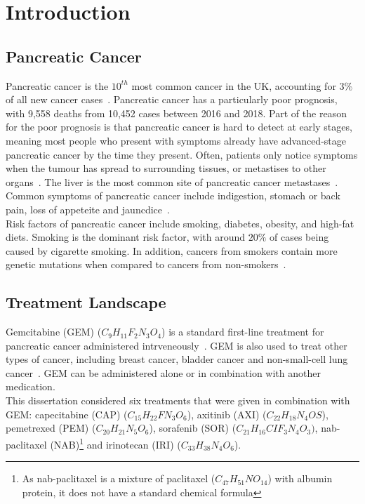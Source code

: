 \chapter{Introduction}

\section{Pancreatic Cancer}
Pancreatic cancer is the $10^{th}$ most common cancer in the UK, accounting for $3\%$ of all new cancer cases~\cite{pancStat}. Pancreatic cancer has a particularly poor prognosis, with 9,558 deaths from 10,452 cases between 2016 and 2018. Part of the reason for the poor prognosis is that pancreatic cancer is hard to detect at early stages, meaning most people who present with symptoms already have advanced-stage pancreatic cancer by the time they present. Often, patients only notice symptoms when the tumour has spread to surrounding tissues, or metastises to other organs~\cite{kelsen}. The liver is the most common site of pancreatic cancer metastases~\cite{deeb}. Common symptoms of pancreatic cancer include indigestion, stomach or back pain, loss of appeteite and jauncdice~\cite{pancSymp}. \\

Risk factors of pancreatic cancer include smoking, diabetes, obesity, and high-fat diets. Smoking is the dominant risk factor, with around $20\%$ of cases being caused by cigarette smoking. In addition, cancers from smokers contain more genetic mutations when compared to cancers from non-smokers~\cite{blackford}. 

\section{Treatment Landscape}
Gemcitabine (GEM) ($C_9H_{11}F_2N_3O_4$) is a standard first-line treatment for pancreatic cancer administered intrveneously~\cite{NG85}. GEM is also used to treat other types of cancer, including breast cancer, bladder cancer and non-small-cell lung cancer~\cite{wong2009}. GEM can be administered alone or in combination with another medication.\\

This dissertation considered six treatments that were given in combination with GEM: capecitabine (CAP) ($C_{15}H_{22}FN_3O_6$), axitinib (AXI) ($C_{22}H_{18}N_4OS$), pemetrexed (PEM) ($C_{20}H_{21}N_5O_6$), sorafenib (SOR) ($C_{21}H_{16}CIF_{3}N_4O_3)$, nab-paclitaxel (NAB)\footnote{As nab-paclitaxel is a mixture of paclitaxel ($C_{47}H_{51}NO_{14}$) with albumin protein, it does not have a standard chemical formula} and irinotecan (IRI) ($C_{33}H_{38}N_4O_6$). \\

